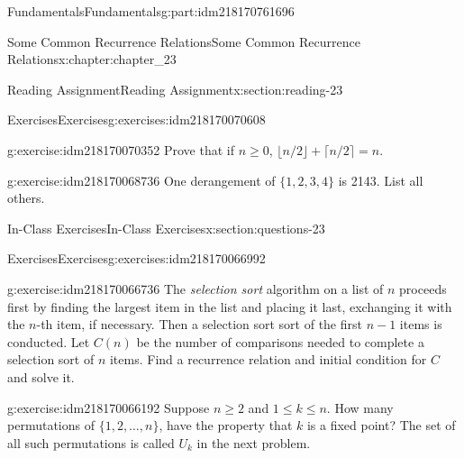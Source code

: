 \documentclass[oneside,10pt,]{book}
\numberwithin{equation}{section}
\begin{document}
\begin{partptx}{Fundamentals}{}{Fundamentals}{}{}{g:part:idm218170761696}
\begin{chapterptx}{Some Common Recurrence Relations}{}{Some Common Recurrence Relations}{}{}{x:chapter:chapter_23}
\begin{sectionptx}{Reading Assignment}{}{Reading Assignment}{}{}{x:section:reading-23}
%
\begin{exercises-subsection-numberless}{Exercises}{}{Exercises}{}{}{g:exercises:idm218170070608}
\par\medskip\noindent%
%
\begin{exercisegroup}
\begin{divisionexerciseeg}{1}{}{}{g:exercise:idm218170070352}%
Prove that if \(n \geq 0\), \(\lfloor n/2\rfloor +\lceil n/2\rceil = n\).%
\end{divisionexerciseeg}%
\begin{divisionexerciseeg}{2}{}{}{g:exercise:idm218170068736}%
One derangement of \(\{1,2,3,4\}\) is 2143.  List all others.%
\end{divisionexerciseeg}%
\end{exercisegroup}
\par\medskip\noindent
\end{exercises-subsection-numberless}
\end{sectionptx}
%
%
\typeout{************************************************}
\typeout{************************************************}
%
\begin{sectionptx}{In-Class Exercises}{}{In-Class Exercises}{}{}{x:section:questions-23}
%
%
%
\typeout{************************************************}
\typeout{************************************************}
%
\begin{exercises-subsection-numberless}{Exercises}{}{Exercises}{}{}{g:exercises:idm218170066992}
\par\medskip\noindent%
%
\begin{exercisegroup}
\begin{divisionexerciseeg}{1}{}{}{g:exercise:idm218170066736}%
The \emph{selection sort} algorithm on a list of \(n\) proceeds first by finding the largest item in the list and placing it last, exchanging it with the \(n\)-th item, if necessary.  Then a selection sort sort of the first \(n-1\) items is conducted. Let \(C(n)\) be the number of comparisons needed to complete a selection sort of \(n\) items.   Find a recurrence relation and initial condition for \(C\) and solve it.%
\end{divisionexerciseeg}%
\begin{divisionexerciseeg}{2}{}{}{g:exercise:idm218170066192}%
Suppose \(n \geq 2\) and \(1 \leq k \leq n\).  How many permutations of \(\{1,2, \dots ,n\}\),  have the property that \(k\) is a fixed point?  The set of all such permutations is called \(U_k\) in the next problem.%

\end{divisionexerciseeg}
\end{exercisegroup}
\end{exercises-subsection-numberless}
\end{sectionptx}
\end{chapterptx}
\end{partptx}
\end{document}
